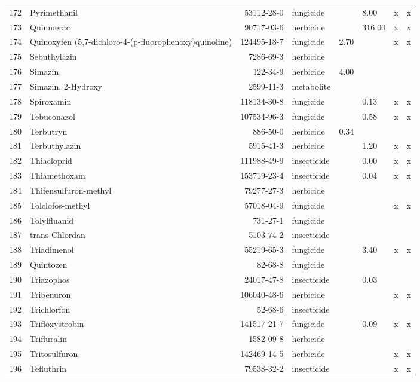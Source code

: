 \begin{longtable}{lp{4cm}rlp{1cm}p{1.5cm}p{1.5cm}p{1cm}}
  172 & Pyrimethanil & 53112-28-0 & fungicide &  & 8.00 & x & x \\ 
  173 & Quinmerac & 90717-03-6 & herbicide &  & 316.00 & x & x \\ 
  174 & Quinoxyfen (5,7-dichloro-4-(p-fluorophenoxy)quinoline) & 124495-18-7 & fungicide & 2.70 &  & x & x \\ 
  175 & Sebuthylazin & 7286-69-3 & herbicide &  &  &  &  \\ 
  176 & Simazin & 122-34-9 & herbicide & 4.00 &  &  &  \\ 
  177 & Simazin, 2-Hydroxy & 2599-11-3 & metabolite &  &  &  &  \\ 
  178 & Spiroxamin & 118134-30-8 & fungicide &  & 0.13 & x & x \\ 
  179 & Tebuconazol & 107534-96-3 & fungicide &  & 0.58 & x & x \\ 
  180 & Terbutryn & 886-50-0 & herbicide & 0.34 &  &  &  \\ 
  181 & Terbuthylazin & 5915-41-3 & herbicide &  & 1.20 & x & x \\ 
  182 & Thiacloprid & 111988-49-9 & insecticide &  & 0.00 & x & x \\ 
  183 & Thiamethoxam & 153719-23-4 & insecticide &  & 0.04 & x & x \\ 
  184 & Thifensulfuron-methyl & 79277-27-3 & herbicide &  &  &  &  \\ 
  185 & Tolclofos-methyl & 57018-04-9 & fungicide &  &  & x & x \\ 
  186 & Tolylfluanid & 731-27-1 & fungicide &  &  &  &  \\ 
  187 & trans-Chlordan & 5103-74-2 & insecticide &  &  &  &  \\ 
  188 & Triadimenol & 55219-65-3 & fungicide &  & 3.40 & x & x \\ 
  189 & Quintozen & 82-68-8 & fungicide &  &  &  &  \\ 
  190 & Triazophos & 24017-47-8 & insecticide &  & 0.03 &  &  \\ 
  191 & Tribenuron & 106040-48-6 & herbicide &  &  & x & x \\ 
  192 & Trichlorfon & 52-68-6 & insecticide &  &  &  &  \\ 
  193 & Trifloxystrobin & 141517-21-7 & fungicide &  & 0.09 & x & x \\ 
  194 & Trifluralin & 1582-09-8 & herbicide &  &  &  &  \\ 
  195 & Tritosulfuron & 142469-14-5 & herbicide &  &  & x & x \\ 
  196 & Tefluthrin & 79538-32-2 & insecticide &  &  & x & x \\ 

\end{longtable}
